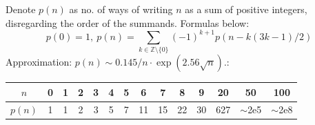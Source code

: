 Denote $p(n)$ as no. of ways of writing $n$ as a sum of positive integers, disregarding the order of the summands. Formulas below:
\[ p(0) = 1,\ p(n) = \sum_{k \in \mathbb Z \setminus \{0\}}{(-1)^{k+1} p(n - k(3k-1) / 2)} \]
Approximation: $p(n) \sim 0.145 / n \cdot \exp(2.56 \sqrt{n})$.:

\begin{center}
\begin{tabular}{c|c@{\ }c@{\ }c@{\ }c@{\ }c@{\ }c@{\ }c@{\ }c@{\ }c@{\ }c@{\ }c@{\ }c@{\ }c}
    $n$    & 0 & 1 & 2 & 3 & 4 & 5 & 6  & 7  & 8  & 9  & 20  & 50  & 100 \\ \hline
    $p(n)$ & 1 & 1 & 2 & 3 & 5 & 7 & 11 & 15 & 22 & 30 & 627 & $\mathtt{\sim}$2e5 & $\mathtt{\sim}$2e8 \\
\end{tabular}
\end{center}